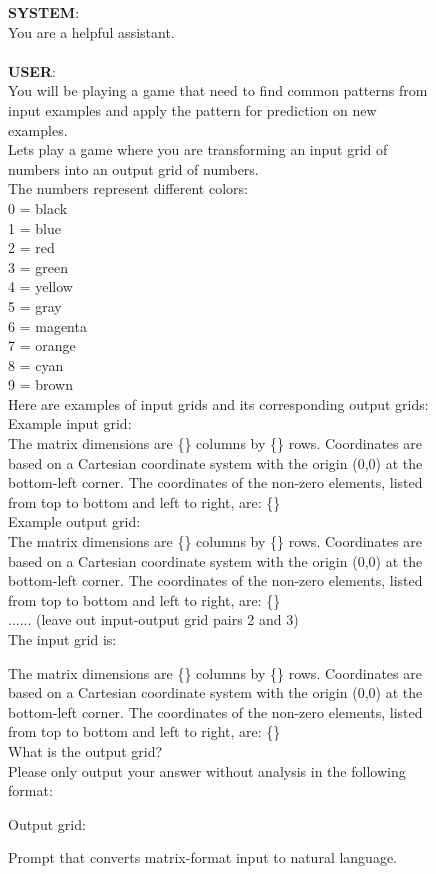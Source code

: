\begin{figure*}
  \begin{tcolorbox}
  \textbf{SYSTEM}:\\
  You are a helpful assistant.\\\\
  \textbf{USER}: \\
        You will be playing a game that need to find common patterns from input examples and apply the pattern for prediction on new examples.\\
Lets play a game where you are transforming an input grid of numbers into an output grid of numbers.\\

The numbers represent different colors:\\
0 = black\\
1 = blue\\
2 = red\\
3 = green\\
4 = yellow\\
5 = gray\\
6 = magenta\\
7 = orange\\
8 = cyan\\
9 = brown\\

Here are examples of input grids and its corresponding output grids:\\
Example input grid:\\
The matrix dimensions are \{\} columns by \{\} rows. Coordinates are based on a Cartesian coordinate system with the origin (0,0) at the bottom-left corner. The coordinates of the non-zero elements, listed from top to bottom and left to right, are: \{\} \\
Example output grid:\\
The matrix dimensions are \{\} columns by \{\} rows. Coordinates are based on a Cartesian coordinate system with the origin (0,0) at the bottom-left corner. The coordinates of the non-zero elements, listed from top to bottom and left to right, are: \{\}\\

...... (leave out input-output grid pairs 2 and 3) \\

The input grid is:

The matrix dimensions are \{\} columns by \{\} rows. Coordinates are based on a Cartesian coordinate system with the origin (0,0) at the bottom-left corner. The coordinates of the non-zero elements, listed from top to bottom and left to right, are: \{\} \\

What is the output grid?  \\

Please only output your answer without analysis in the following format:

Output grid:

    \end{tcolorbox}
    \caption{Prompt that converts matrix-format input to natural language.}
    \label{fig:natural language prompt}
\end{figure*}

